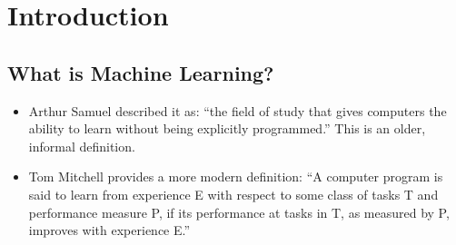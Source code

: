 \chapter{Introduction} 


\section{What is Machine Learning?}
\begin{itemize} 
    \item Arthur Samuel described it as: 
    ``the field of study that gives computers the ability to learn without being explicitly programmed.'' 
    This is an older, informal definition.
    \item Tom Mitchell provides a more modern definition: 
    ``A computer program is said to learn from experience E with respect to some class of tasks T and performance measure P, 
    if its performance at tasks in T, as measured by P, improves with experience E.'' 
\end{itemize}


